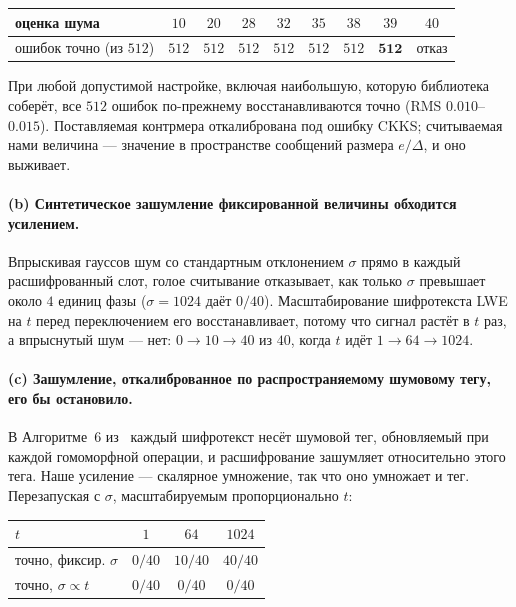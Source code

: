 \documentclass[11pt]{article}
\begin{document}
\begin{table}[h]
\centering
\begin{tabular}{lcccccccc}
\toprule
оценка шума & $10$ & $20$ & $28$ & $32$ & $35$ & $38$ & $39$ & $40$ \\
\midrule
ошибок точно (из $512$) & $512$ & $512$ & $512$ & $512$ & $512$ & $512$ & $\mathbf{512}$ & отказ \\
\bottomrule
\end{tabular}
\end{table}

При любой допустимой настройке, включая наибольшую, которую библиотека соберёт, все $512$ ошибок
по-прежнему восстанавливаются точно (RMS $0.010$--$0.015$). Поставляемая контрмера откалибрована под
ошибку CKKS; считываемая нами величина --- значение в пространстве сообщений размера $e/\Delta$, и
оно выживает.

\paragraph{(b) Синтетическое зашумление фиксированной величины обходится усилением.}
Впрыскивая гауссов шум со стандартным отклонением $\sigma$ прямо в каждый расшифрованный слот, голое
считывание отказывает, как только $\sigma$ превышает около $4$ единиц фазы ($\sigma = 1024$ даёт
$0/40$). Масштабирование шифротекста LWE на $t$ перед переключением его восстанавливает, потому что
сигнал растёт в $t$ раз, а впрыснутый шум --- нет: $0 \to 10 \to 40$ из $40$, когда $t$ идёт
$1 \to 64 \to 1024$.

\paragraph{(c) Зашумление, откалиброванное по распространяемому шумовому тегу, его бы остановило.}
В Алгоритме~6 из~\cite{santato2026} каждый шифротекст несёт шумовой тег, обновляемый при каждой
гомоморфной операции, и расшифрование зашумляет относительно этого тега. Наше усиление --- скалярное
умножение, так что оно умножает и тег. Перезапуская с $\sigma$, масштабируемым пропорционально $t$:

\begin{table}[h]
\centering
\begin{tabular}{lccc}
\toprule
$t$ & $1$ & $64$ & $1024$ \\
\midrule
точно, фиксир. $\sigma$     & $0/40$ & $10/40$ & $40/40$ \\
точно, $\sigma \propto t$ & $0/40$ & $0/40$  & $0/40$ \\
\bottomrule
\end{tabular}
\end{table}
\end{document}
